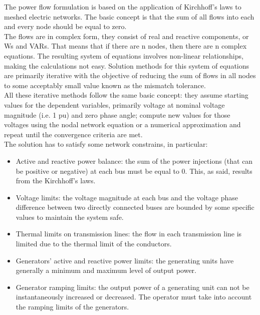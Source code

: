 The power flow formulation is based on the application of Kirchhoff’s laws to meshed electric networks. The basic concept is that the sum of all flows into each and every node should be equal to zero.\\
The flows are in complex form, they consist of real and reactive components, or \glspl{W} and \glspl{VAR}. That means that if there are n nodes, then there are n complex equations. The resulting system of equations involves non-linear relationships, making the calculations not easy. Solution methods for this system of equations are primarily iterative with the objective of reducing the sum of flows in all nodes to some acceptably small value known as the mismatch tolerance. \\

All these iterative methods follow the same basic concept: they assume starting values for the dependent variables, primarily voltage at nominal voltage magnitude (i.e. 1 \gls{pu}) and zero phase angle; compute new values for those voltages using the nodal network equation or a numerical approximation and repeat until the convergence criteria are met. \\

The solution has to satisfy some network constrains, in particular:
\begin{itemize}
    \item Active and reactive power balance: the sum of the power injections (that can be positive or negative) at each bus must be equal to 0. This, as said, results from the Kirchhoff’s laws.
    
    \item Voltage limits: the voltage magnitude at each bus and the voltage phase difference between two directly connected buses are bounded by some specific values to maintain the system safe.
    
    \item Thermal limits on transmission lines: the flow in each transmission line is limited due to the thermal limit of the conductors.
    
    \item Generators' active and reactive power limits: the generating units have generally a minimum and maximum level of output power.
    
    \item Generator ramping limits: the output power of a generating unit can not be instantaneously increased or decreased. The operator must take into account the ramping limits of the generators.
\end{itemize}

